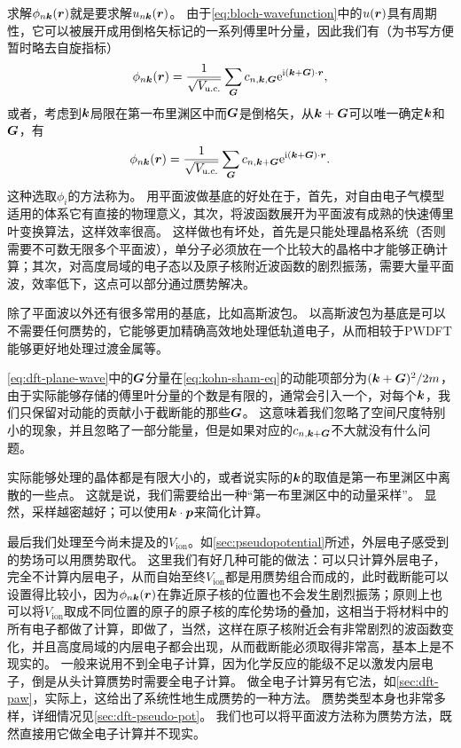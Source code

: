 求解$\phi_{n \vb*{k}}(\vb*{r})$就是要求解$u_{n \vb*{k}}(\vb*{r})$。
由于\eqref{eq:bloch-wavefunction}中的$u(\vb*{r})$具有周期性，它可以被展开成用倒格矢标记的一系列傅里叶分量，因此我们有（为书写方便暂时略去自旋指标）
\begin{equation}
    \phi_{n \vb*{k}}(\vb*{r}) = \frac{1}{\sqrt{V_\text{u.c.}}} \sum_{\vb*{G}} c_{n, \vb*{k}, \vb*{G}} \mathrm{e}^{\mathrm{i} (\vb*{k} + \vb*{G}) \cdot \vb*{r}},
\end{equation}
或者，考虑到$\vb*{k}$局限在第一布里渊区中而$\vb*{G}$是倒格矢，从$\vb*{k} + \vb*{G}$可以唯一确定$\vb*{k}$和$\vb*{G}$，有
\begin{equation}
    \phi_{n \vb*{k}}(\vb*{r}) = \frac{1}{\sqrt{V_\text{u.c.}}} \sum_{\vb*{G}} c_{n, \vb*{k} + \vb*{G}} \mathrm{e}^{\mathrm{i} (\vb*{k} + \vb*{G}) \cdot \vb*{r}}.
    \label{eq:dft-plane-wave}
\end{equation}
这种选取$\phi_i$的方法称为。
用平面波做基底的好处在于，首先，对自由电子气模型适用的体系它有直接的物理意义，其次，将波函数展开为平面波有成熟的快速傅里叶变换算法，这样效率很高。
这样做也有坏处，首先是只能处理晶格系统（否则需要不可数无限多个平面波），单分子必须放在一个比较大的晶格中才能够正确计算；其次，对高度局域的电子态以及原子核附近波函数的剧烈振荡，需要大量平面波，效率低下，这点可以部分通过赝势解决。

除了平面波以外还有很多常用的基底，比如高斯波包。
以高斯波包为基底是可以不需要任何赝势的，它能够更加精确高效地处理低轨道电子，从而相较于PWDFT能够更好地处理过渡金属等。

\eqref{eq:dft-plane-wave}中的$\vb*{G}$分量在\eqref{eq:kohn-sham-eq}的动能项部分为$(\vb*{k} + \vb*{G})^2 / 2m$，由于实际能够存储的傅里叶分量的个数是有限的，通常会引入一个，对每个$\vb*{k}$，我们只保留对动能的贡献小于截断能的那些$\vb*{G}$。
这意味着我们忽略了空间尺度特别小的现象，并且忽略了一部分能量，但是如果对应的$c_{n, \vb*{k} + \vb*{G}}$不大就没有什么问题。

实际能够处理的晶体都是有限大小的，或者说实际的$\vb*{k}$的取值是第一布里渊区中离散的一些点。
这就是说，我们需要给出一种“第一布里渊区中的动量采样”。
显然，采样越密越好；可以使用$\vb*{k} \cdot \vb*{p}$来简化计算。

最后我们处理至今尚未提及的$V_\text{ion}$。如\autoref{sec:pseudopotential}所述，外层电子感受到的势场可以用赝势取代。
这里我们有好几种可能的做法：可以只计算外层电子，完全不计算内层电子，从而自始至终$V_\text{ion}$都是用赝势组合而成的，此时截断能可以设置得比较小，因为$\phi_{n \vb*{k}}(\vb*{r})$在靠近原子核的位置也不会发生剧烈振荡；原则上也可以将$V_\text{ion}$取成不同位置的原子的原子核的库伦势场的叠加，这相当于将材料中的所有电子都做了计算，即做了，当然，这样在原子核附近会有非常剧烈的波函数变化，并且高度局域的内层电子都会出现，从而截断能必须取得非常高，基本上是不现实的。
一般来说用不到全电子计算，因为化学反应的能级不足以激发内层电子，倒是从头计算赝势时需要全电子计算。
做全电子计算另有它法，如\autoref{sec:dft-paw}，实际上，这给出了系统性地生成赝势的一种方法。
赝势类型本身也非常多样，详细情况见\autoref{sec:dft-pseudo-pot}。
我们也可以将平面波方法称为赝势方法，既然直接用它做全电子计算并不现实。

